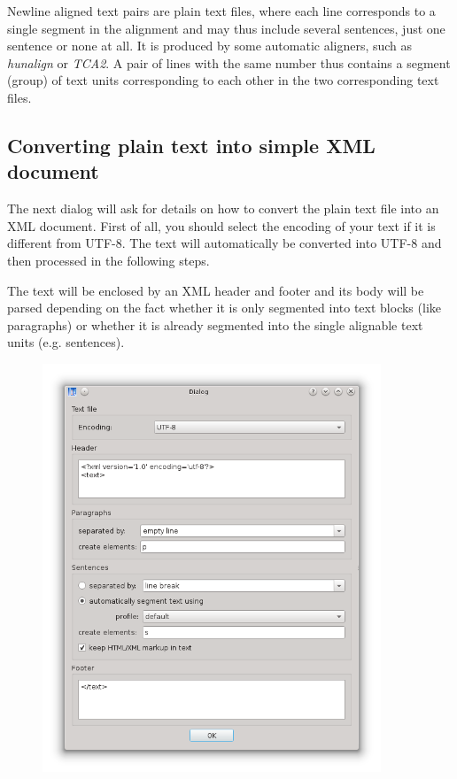 \documentclass[a4paper,10pt,oneside]{book}
\begin{document}
Newline aligned text pairs are plain text files, where each line corresponds to a single segment in the alignment and may thus include several sentences, just one sentence or none at all. It is produced by some automatic aligners, such as \emph{hunalign} or \emph{TCA2}. A pair of lines with the same number thus contains a segment (group) of text units corresponding to each other in the two corresponding text files.

\subsection{Converting plain text into simple XML document}\label{ch:detail:managing_local:new:txt2xml}

The next dialog will ask for details on how to convert the plain text file into an XML document. First of all, you should select the encoding of your text if it is different from UTF-8. The text will automatically be converted into UTF-8 and then processed in the following steps.

The text will be enclosed by an XML header and footer and its body will be parsed depending on the fact whether it is only segmented into text blocks (like paragraphs) or whether it is already segmented into the single alignable text units (e.g. sentences).

\begin{figure}[htb]
 \includegraphics[width=0.9\textwidth]{screenshots/text_import.png}
\end{figure}
\end{document}
